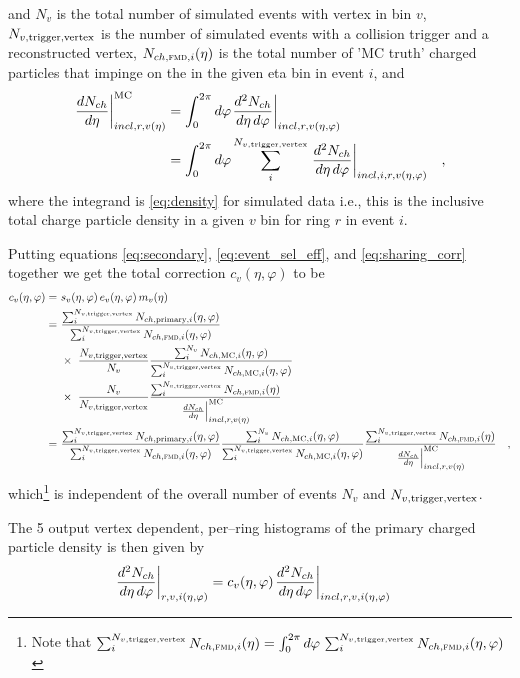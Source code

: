 \documentclass[11pt]{article}
\def\AlwaysText#1{\ifmmode\relax\text{#1}\else #1\fi}
\newcommand{\AbbrName}[1]{\AlwaysText{{\scshape #1}}}
\newcommand{\FMD}[1][]{\AbbrName{fmd\ifx|#1|\else#1\fi}}
\newcommand{\dndetadphi}[1][]{{\ensuremath%
    \ifx|#1|\else\left.\fi%
    \frac{d^2N_{ch}}{d\eta\,d\varphi}%
    \ifx|#1|\else\right|_{#1}\fi%
}}
\newcommand{\MC}{\AlwaysText{MC}}
\newcommand{\Nsel}{{\ensuremath N_{v,\text{trigger,vertex}}}}
\begin{document}
  and $N_v$ is the total number of simulated events with vertex in bin
  $v$, $\Nsel{}$ is the number of simulated events with a collision
  trigger and a reconstructed vertex, $N_{ch,\text{\FMD{}},i}(\eta)$ is
  the total number of 'MC truth' charged particles that impinge on the
  \FMD{} in the given eta  bin in event $i$, and 
  \begin{align}
    \left.\frac{dN_{ch}}{d\eta}\right|_{incl,r,v(\eta)}^{\MC{}} &= 
    \int_0^{2\pi}d\varphi\dndetadphi[incl,r,v(\eta,\varphi)]
    \nonumber\\
    &=  \int_0^{2\pi}d\varphi\sum_i^{\Nsel{}}\dndetadphi[incl,i,r,v(\eta,\varphi)]\quad,
  \end{align}
  where the integrand is \eqref{eq:density} for simulated data i.e.,
  this is the inclusive total charge particle density in a given $v$
  bin for ring $r$ in event $i$. 

Putting equations \eqref{eq:secondary}, \eqref{eq:event_sel_eff}, and
\eqref{eq:sharing_corr} together we get the total correction
$c_v(\eta,\varphi)$ to be 
\begin{align}
  \label{eq:total_corr}
  c_v(\eta,\varphi) =\ &
  s_v(\eta,\varphi)\,e_v(\eta,\varphi)\,m_v(\eta)\nonumber\\ 
  =\ & \frac{\sum_i^{\Nsel}N_{ch,\text{primary},i}(\eta,\varphi)}{
      \sum_i^{\Nsel}N_{ch,\text{\FMD{}},i}(\eta,\varphi)}
    \nonumber\\
    & \times\ \frac{\Nsel{}}{N_{v}} \frac{\sum_{i}^{N_{v}} 
      N_{ch,\MC{},i}(\eta,\varphi)}{\sum_{i}^{\Nsel{}}
      N_{ch,\MC{},i}(\eta,\varphi)}\nonumber\\
    & \times\ \frac{N_v}{\Nsel{}}
    \frac{\sum_i^{\Nsel{}}N_{ch,\text{\FMD{}},i}(\eta)}{
      \left.\frac{dN_{ch}}{d\eta}\right|_{incl,r,v(\eta)}^{\MC}}\nonumber\\
  =\ & \frac{\sum_i^{\Nsel}N_{ch,\text{primary},i}(\eta,\varphi)}{
      \sum_i^{\Nsel}N_{ch,\text{\FMD{}},i}(\eta,\varphi)}
    \frac{\sum_{i}^{N_{v}} N_{ch,\MC{},i}(\eta,\varphi)}{
      \sum_{i}^{\Nsel{}} N_{ch,\MC{},i}(\eta,\varphi)}
    \frac{\sum_i^{\Nsel{}}N_{ch,\text{\FMD{}},i}(\eta)}{
      \left.\frac{dN_{ch}}{d\eta}\right|_{incl,r,v(\eta)}^{\MC}}\quad,
\end{align}
which\footnote{Note that $\sum_{i}^{\Nsel{}} N_{ch,\FMD{},i}(\eta) =
  \int_0^{2\pi}d\varphi\,\sum_{i}^{\Nsel{}}
  N_{ch,\FMD{},i}(\eta,\varphi)$} is independent of the overall
number of events $N_v$ and $\Nsel{}$.

The 5 output vertex dependent, per--ring histograms of the primary
charged particle density is then given by
\begin{align}
  \dndetadphi[r,v,i(\eta,\varphi)] &=
  c_v(\eta,\varphi)\dndetadphi[incl,r,v,i(\eta,\varphi)]
\end{align}
\end{document}
